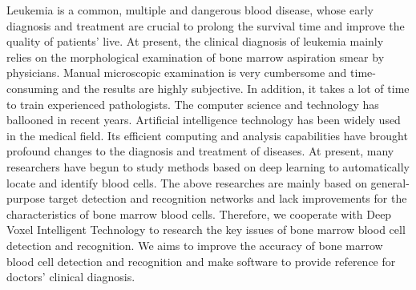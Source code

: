 \begin{abstract*}
Leukemia is a common, multiple and dangerous blood disease, whose early diagnosis and treatment are
crucial to prolong the survival time and improve the quality of patients' live. 
At present, the clinical diagnosis of leukemia mainly relies on the morphological examination of bone marrow aspiration smear by physicians.
Manual microscopic examination is very cumbersome and time-consuming and the results are highly subjective. In addition, it takes a lot of time to train experienced pathologists.
The computer science and technology has ballooned in recent years. Artificial intelligence technology has been widely used in the medical field. Its efficient computing and analysis capabilities 
have brought profound changes to the diagnosis and treatment of diseases. 
At present, many researchers have begun to study methods based on deep learning to automatically locate and identify blood cells. 
The above researches are mainly based on general-purpose target detection and recognition networks 
and lack improvements for the characteristics of bone marrow blood cells.
Therefore, we cooperate with Deep Voxel Intelligent Technology to research the key issues of bone marrow blood cell 
detection and recognition. We aims to improve the accuracy of bone marrow blood cell detection and recognition and make software to provide reference for doctors' clinical diagnosis.


\end{abstract*}
